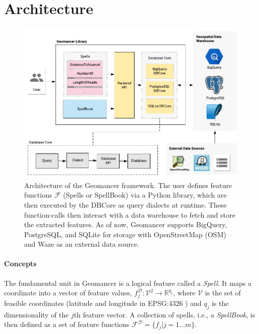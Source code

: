 \documentclass{article}
\begin{document}
\section{Architecture}

\begin{figure}
    \begin{center}
        \includegraphics[width=0.85\linewidth]{architecture.pdf}
    \end{center}
  \caption{
    Architecture of the Geomancer framework. The user defines feature functions
    $\mathcal{F}$  (Spells or SpellBook) via a Python library, which are then
    executed by the DBCore as query dialects at runtime. These function-calls
    then interact with a data warehouse to fetch and store the extracted
    features. As of now, Geomancer supports BigQuery, PostgreSQL, and SQLite
    for storage with OpenStreetMap (OSM) and Waze as an external data source. 
    }

  \label{fig:architecture}
\end{figure}

\paragraph{Concepts}
The fundamental unit in Geomancer is a logical feature \cite{smith2017ballet}
called a \textit{Spell}. It maps a coordinate into a vector of feature values,
$f_{j}^{\mathcal{D}} : \mathcal{V}^{2} \rightarrow \mathbb{R}^{q_j}$, where
$\mathcal{V}$ is the set of feasible coordinates (latitude and longitude in
EPSG:4326 \cite{WGS84EPS46:online}) and $q_{j}$ is the dimensionality of the $j$th feature vector. A
collection of spells, i.e., a \textit{SpellBook}, is then defined as a set of
feature functions $\mathcal{F}^{\mathcal{D}} = \{f_j \vert j = 1 \dots m\}$. 
\end{document}
